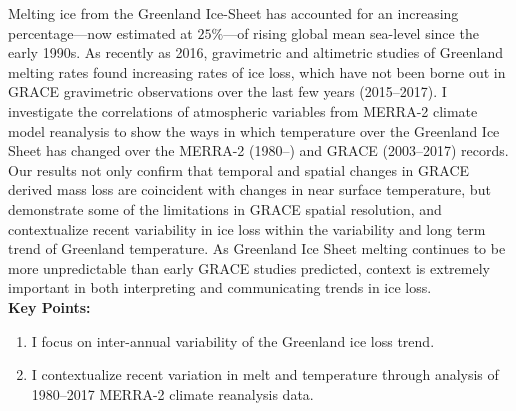 

Melting ice from the Greenland Ice-Sheet has accounted for an increasing percentage---now estimated at $25\%$---of rising global mean sea-level since the early 1990s. As recently as 2016, gravimetric and altimetric studies of Greenland melting rates found increasing rates of ice loss, which have not been borne out in GRACE gravimetric observations over the last few years (2015--2017). I investigate the correlations of atmospheric variables from MERRA-2 climate model reanalysis to show the ways in which temperature over the Greenland Ice Sheet has changed over the MERRA-2 (1980--) and GRACE (2003--2017) records. Our results not only confirm that temporal and spatial changes in GRACE derived mass loss are coincident with changes in near surface temperature, but demonstrate some of the limitations in GRACE spatial resolution, and contextualize recent variability in ice loss within the variability and long term trend of Greenland temperature. As Greenland Ice Sheet melting continues to be more unpredictable than early GRACE studies predicted, context is extremely important in both interpreting and communicating trends in ice loss. \\[3em]

\textbf{Key Points:}
\begin{enumerate}
	\item I focus on inter-annual variability of the Greenland ice loss trend.
	\item I contextualize recent variation in melt and temperature through analysis of 1980--2017 MERRA-2 climate reanalysis data. 

\end{enumerate}